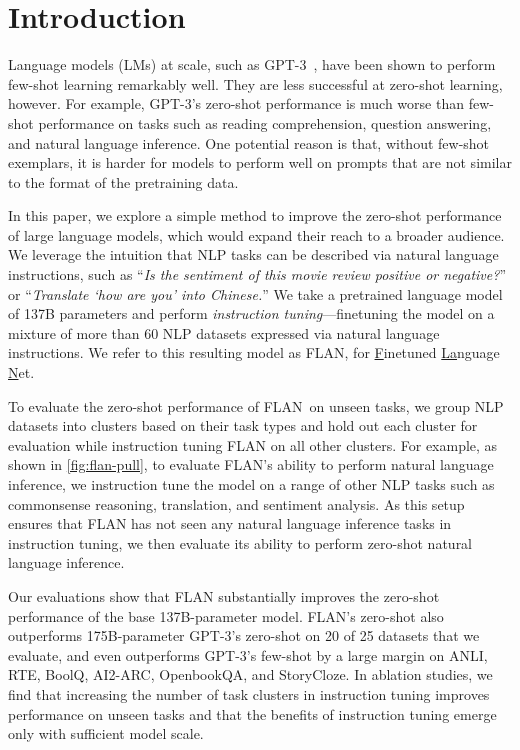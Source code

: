 \documentclass{article} \usepackage{iclr2022_conference,times}
\newcommand{\flan}{FLAN}
\begin{document}
\section{Introduction}

Language models (LMs) at scale, such as GPT-3~\citep{brown2020language}, have been shown to perform few-shot learning remarkably well. 
They are less successful at zero-shot learning, however.
For example, GPT-3's zero-shot performance is much worse than few-shot performance on tasks such as reading comprehension, question answering, and natural language inference. 
One potential reason is that, without few-shot exemplars, it is harder for models to perform well on prompts that are not similar to the format of the pretraining data.

In this paper, we explore a simple method to improve the zero-shot performance of large language models, which would expand their reach to a broader audience.
We leverage the intuition that NLP tasks can be described via natural language instructions, such as ``\textit{Is the sentiment of this movie review positive or negative?}'' or ``\textit{Translate `how are you' into Chinese.}''
We take a pretrained language model of 137B parameters and perform \textit{instruction tuning}---finetuning the model on a mixture of more than 60 NLP datasets expressed via natural language instructions.
We refer to this resulting model as \flan, for \underline{F}inetuned \underline{La}nguage \underline{N}et.

To evaluate the zero-shot performance of \flan\ on unseen tasks, we group NLP datasets into clusters based on their task types and hold out each cluster for evaluation while instruction tuning \flan{} on all other clusters.
For example, as shown in \cref{fig:flan-pull}, to evaluate \flan's ability to perform natural language inference, we instruction tune the model on a range of other NLP tasks such as commonsense reasoning, translation, and sentiment analysis.
As this setup ensures that \flan{} has not seen any natural language inference tasks in instruction tuning, we then evaluate its ability to perform zero-shot natural language inference.

Our evaluations show that \flan{} substantially improves the zero-shot performance of the base 137B-parameter model.
\flan's zero-shot also outperforms 175B-parameter GPT-3's zero-shot on 20 of 25 datasets that we evaluate, and even outperforms GPT-3's few-shot by a large margin on ANLI, RTE, BoolQ, AI2-ARC, OpenbookQA, and StoryCloze. 
In ablation studies, we find that increasing the number of task clusters in instruction tuning improves performance on unseen tasks and that the benefits of instruction tuning emerge only with sufficient model scale. 
\end{document}
